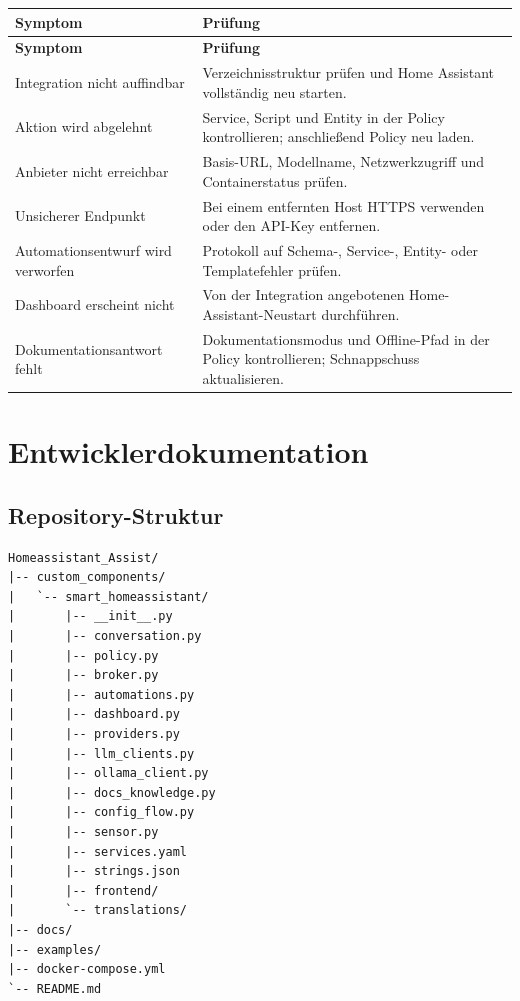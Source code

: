 \documentclass[
  11pt,
  a4paper,
  oneside,
  parskip=half
]{scrreprt}
\begin{document}
\begin{longtable}{@{}L{54mm}L{89mm}@{}}
  \toprule
  \textbf{Symptom} & \textbf{Prüfung} \\
  \midrule
  \endfirsthead
  \toprule
  \textbf{Symptom} & \textbf{Prüfung} \\
  \midrule
  \endhead
  Integration nicht auffindbar &
    Verzeichnisstruktur prüfen und Home Assistant vollständig neu starten. \\
  Aktion wird abgelehnt &
    Service, Script und Entity in der Policy kontrollieren; anschließend Policy neu
    laden. \\
  Anbieter nicht erreichbar &
    Basis-URL, Modellname, Netzwerkzugriff und Containerstatus prüfen. \\
  Unsicherer Endpunkt &
    Bei einem entfernten Host HTTPS verwenden oder den API-Key entfernen. \\
  Automationsentwurf wird verworfen &
    Protokoll auf Schema-, Service-, Entity- oder Templatefehler prüfen. \\
  Dashboard erscheint nicht &
    Von der Integration angebotenen Home-Assistant-Neustart durchführen. \\
  Dokumentationsantwort fehlt &
    Dokumentationsmodus und Offline-Pfad in der Policy kontrollieren; Schnappschuss
    aktualisieren. \\
  \bottomrule
\end{longtable}

\chapter{Entwicklerdokumentation}

\section{Repository-Struktur}

\begin{lstlisting}
Homeassistant_Assist/
|-- custom_components/
|   `-- smart_homeassistant/
|       |-- __init__.py
|       |-- conversation.py
|       |-- policy.py
|       |-- broker.py
|       |-- automations.py
|       |-- dashboard.py
|       |-- providers.py
|       |-- llm_clients.py
|       |-- ollama_client.py
|       |-- docs_knowledge.py
|       |-- config_flow.py
|       |-- sensor.py
|       |-- services.yaml
|       |-- strings.json
|       |-- frontend/
|       `-- translations/
|-- docs/
|-- examples/
|-- docker-compose.yml
`-- README.md
\end{lstlisting}
\end{document}
